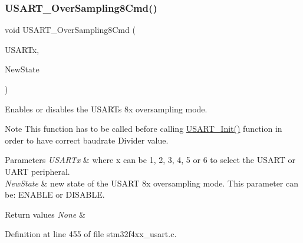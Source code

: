 \mbox{\label{group___u_s_a_r_t___group1_ga3897bab07491d9239f8a238a9a7cddea}} 
\subsubsection{\texorpdfstring{U\+S\+A\+R\+T\+\_\+\+Over\+Sampling8\+Cmd()}{USART\_OverSampling8Cmd()}}
{\footnotesize\ttfamily void U\+S\+A\+R\+T\+\_\+\+Over\+Sampling8\+Cmd (\begin{DoxyParamCaption}\item[{\hyperlink{struct_u_s_a_r_t___type_def}{U\+S\+A\+R\+T\+\_\+\+Type\+Def} $\ast$}]{U\+S\+A\+R\+Tx,  }\item[{Functional\+State}]{New\+State }\end{DoxyParamCaption})}



Enables or disables the U\+S\+A\+RT\textquotesingle{}s 8x oversampling mode. 

\begin{DoxyNote}{Note}
This function has to be called before calling \hyperlink{group___u_s_a_r_t___group1_ga98da340ea0324002ba1b4263e91ab2ff}{U\+S\+A\+R\+T\+\_\+\+Init()} function in order to have correct baudrate Divider value. 
\end{DoxyNote}

\begin{DoxyParams}{Parameters}
{\em U\+S\+A\+R\+Tx} & where x can be 1, 2, 3, 4, 5 or 6 to select the U\+S\+A\+RT or U\+A\+RT peripheral. \\
\hline
{\em New\+State} & new state of the U\+S\+A\+RT 8x oversampling mode. This parameter can be\+: E\+N\+A\+B\+LE or D\+I\+S\+A\+B\+LE. \\
\hline
\end{DoxyParams}

\begin{DoxyRetVals}{Return values}
{\em None} & \\
\hline
\end{DoxyRetVals}


Definition at line 455 of file stm32f4xx\+\_\+usart.\+c.

